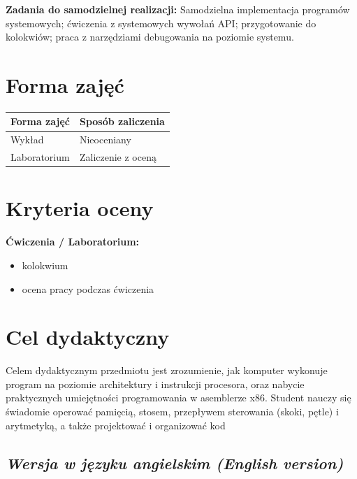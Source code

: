\documentclass[12pt, a4paper]{article}
\newcommand{\thdrule}{\noalign{\global\setlength{\extrarowheight}{0pt}}}
\newcommand{\thdend}{\noalign{\global\setlength{\extrarowheight}{3pt}}}
\begin{document}
\vspace{4pt}
\noindent\textbf{Zadania do samodzielnej realizacji:} Samodzielna implementacja programów systemowych; ćwiczenia z systemowych wywołań API; przygotowanie do kolokwiów; praca z narzędziami debugowania na poziomie systemu.

\section{Forma zajęć}

\begin{center}
{\scriptsize
\begin{tabular}{m{5cm}m{8cm}}
\thdrule\toprule
\rowcolor{pjatkRed} {\color{white}\textbf{Forma zajęć}} & {\color{white}\textbf{Sposób zaliczenia}} \\
\midrule\thdend
  \rowcolor{tableRowLight} Wykład & Nieoceniany \\
  \rowcolor{tableRowAlt} Laboratorium & Zaliczenie z oceną \\
\bottomrule
\end{tabular}}
\end{center}

\section{Kryteria oceny}

\textbf{Ćwiczenia / Laboratorium:}
\begin{itemize}
  \item kolokwium
  \item ocena pracy podczas ćwiczenia
\end{itemize}


\section{Cel dydaktyczny}

Celem dydaktycznym przedmiotu jest zrozumienie, jak komputer wykonuje program na poziomie architektury i instrukcji procesora, oraz nabycie praktycznych umiejętności programowania w asemblerze x86. Student nauczy się świadomie operować pamięcią, stosem, przepływem sterowania (skoki, pętle) i arytmetyką, a także projektować i organizować kod

\subsection*{\textit{Wersja w języku angielskim (English version)}}
\end{document}
